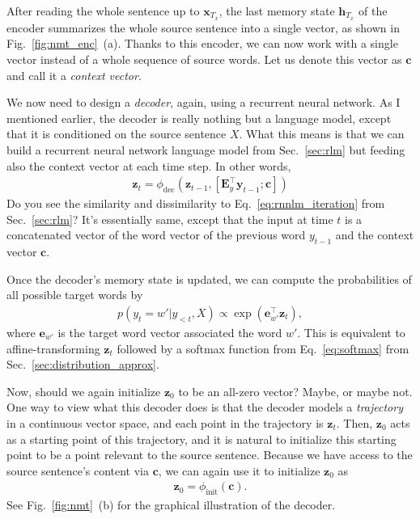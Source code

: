 \documentclass{report}
\newcommand{\vect}[1]{\mathbf{#1}}
\newcommand{\matr}[1]{\mathbf{#1}}
\newcommand{\vc}[0]{\vect{c}}
\newcommand{\ve}[0]{\vect{e}}
\newcommand{\vh}[0]{\vect{h}}
\newcommand{\vx}[0]{\vect{x}}
\newcommand{\vz}[0]{\vect{z}}
\newcommand{\vy}[0]{\vect{y}}
\newcommand{\mE}[0]{\matr{E}}
\newcommand{\init}{\text{init}}
\newcommand{\dec}{\text{dec}}
\begin{document}
After reading the whole sentence up to $\vx_{T_x}$, the last memory state
$\vh_{T_x}$ of the encoder summarizes the whole source sentence into a single
vector, as shown in Fig.~\ref{fig:nmt_enc}~(a). Thanks to this encoder, we can now
work with a single vector instead of a whole sequence of source words. Let us
denote this vector as $\vc$ and call it a {\em context vector}.

We now need to design a {\em decoder}, again, using a recurrent neural network.
As I mentioned earlier, the decoder is really nothing but a language model,
except that it is conditioned on the source sentence $X$. What this means is
that we can build a recurrent neural network language model from
Sec.~\ref{sec:rlm} but feeding also the context vector at each time step. In
other words,
\begin{align}
    \label{eq:nmt_decoder}
    \vz_t = \phi_{\dec}\left( \vz_{t-1}, \left[ \mE_y^\top \vy_{t-1}; \vc
    \right]\right)
\end{align}
Do you see the similarity and dissimilarity to Eq.~\eqref{eq:rnnlm_iteration}
from Sec.~\ref{sec:rlm}? It's essentially same, except that the input at time $t$
is a concatenated vector of the word vector of the previous word $y_{t-1}$ and
the context vector $\vc$.

Once the decoder's memory state is updated, we can compute the probabilities of
all possible target words by
\begin{align}
    \label{eq:nmt_decoder_out}
    p(y_t = w'|y_{<t}, X) \propto \exp\left( \ve_{w'}^\top \vz_t \right),
\end{align}
where $\ve_{w'}$ is the target word vector associated the word $w'$. This is
equivalent to affine-transforming $\vz_t$ followed by a softmax function from
Eq.~\eqref{eq:softmax} from Sec.~\ref{sec:distribution_approx}.

Now, should we again initialize $\vz_0$ to be an all-zero vector? Maybe, or
maybe not. One way to view what this decoder does is that the decoder models a
{\em trajectory} in a continuous vector space, and each point in the trajectory
is $\vz_t$. Then, $\vz_0$ acts as a starting point of this trajectory, and it is
natural to initialize this starting point to be a point relevant to the source
sentence. Because we have access to the source sentence's content via $\vc$, we
can again use it to initialize $\vz_0$ as
\begin{align}
    \label{eq:nmt_init}
    \vz_0 = \phi_{\init}\left( \vc \right).
\end{align}
See Fig.~\ref{fig:nmt}~(b) for the graphical illustration of the decoder.
\end{document}
